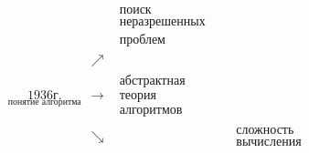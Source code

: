 \begin{note}[История]
    \[
        \begin{array}{ccccc}
                                                                       &             & \boxed{\begin{array}{c}
                                                                                                      \text{поиск}         \\
                                                                                                      \text{неразрешенных} \\
                                                                                                      \text{проблем}
                                                                                                  \end{array}}                                                \\
                                                                       & \nearrow    &                           &                      &                         \\
            \underset{\text{понятие алгоритма}}{\boxed{1936\text{г.}}} & \rightarrow & \boxed{\begin{array}{c}
                                                                                                      \text{абстрактная} \\
                                                                                                      \text{теория}      \\
                                                                                                      \text{алгоритмов}
                                                                                                  \end{array}  }   &                      &                           \\
                                                                       & \searrow    &                           &                      & \boxed{\begin{array}{c}
                                                                                                                                                         \text{сложность} \\
                                                                                                                                                         \text{вычисления}
                                                                                                                                                     \end{array}} \\

\end{array}\]
\end{note}
